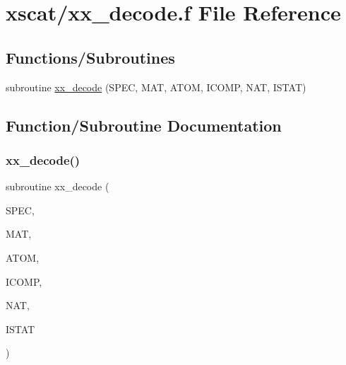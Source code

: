 \hypertarget{xx__decode_8f}{}\section{xscat/xx\+\_\+decode.f File Reference}
\label{xx__decode_8f}
\subsection*{Functions/\+Subroutines}
\begin{DoxyCompactItemize}
\item 
subroutine \hyperlink{xx__decode_8f_a4681a92057af478a4dfb3b5fb97ef508}{xx\+\_\+decode} (S\+P\+EC, M\+AT, A\+T\+OM, I\+C\+O\+MP, N\+AT, I\+S\+T\+AT)
\end{DoxyCompactItemize}


\subsection{Function/\+Subroutine Documentation}
\mbox{\label{xx__decode_8f_a4681a92057af478a4dfb3b5fb97ef508}} 
\subsubsection{\texorpdfstring{xx\+\_\+decode()}{xx\_decode()}}
{\footnotesize\ttfamily subroutine xx\+\_\+decode (\begin{DoxyParamCaption}\item[{character, dimension($\ast$)}]{S\+P\+EC,  }\item[{integer}]{M\+AT,  }\item[{character, dimension(2)}]{A\+T\+OM,  }\item[{integer, dimension(mat)}]{I\+C\+O\+MP,  }\item[{integer}]{N\+AT,  }\item[{integer}]{I\+S\+T\+AT }\end{DoxyParamCaption})}

